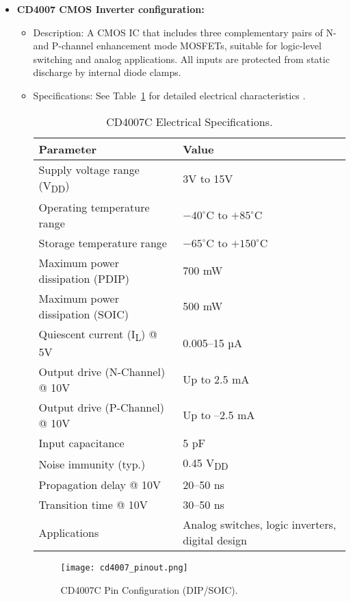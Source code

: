 \documentclass[conference]{IEEEtran}
\begin{document}
\begin{itemize}
    \item \textbf{CD4007 CMOS Inverter configuration:}
    \begin{itemize}
        \item Description: A CMOS IC that includes three complementary pairs of N- and P-channel enhancement mode MOSFETs, suitable for logic-level switching and analog applications. All inputs are protected from static discharge by internal diode clamps.
        \item Specifications: See Table~\ref{tab:cd4007_specs} for detailed electrical characteristics \cite{CD4007_Datasheet}.
        \begin{table}[h]
            \centering
            \begin{tabular}{ll}
                \toprule
                \textbf{Parameter} & \textbf{Value} \\
                \midrule
                Supply voltage range (V\textsubscript{DD}) & 3V to 15V \\
                Operating temperature range & $-40^{\circ}$C to $+85^{\circ}$C \\
                Storage temperature range & $-65^{\circ}$C to $+150^{\circ}$C \\
                Maximum power dissipation (PDIP) & 700 mW \\
                Maximum power dissipation (SOIC) & 500 mW \\
                Quiescent current (I\textsubscript{L}) @ 5V & 0.005–15 µA \\
                Output drive (N-Channel) @ 10V & Up to 2.5 mA \\
                Output drive (P-Channel) @ 10V & Up to –2.5 mA \\
                Input capacitance & 5 pF \\
                Noise immunity (typ.) & 0.45 V\textsubscript{DD} \\
                Propagation delay @ 10V & 20–50 ns \\
                Transition time @ 10V & 30–50 ns \\
                Applications & Analog switches, logic inverters, digital design \\
                \bottomrule
            \end{tabular}
            \caption{CD4007C Electrical Specifications.}
            \label{tab:cd4007_specs}
        \end{table}
        \begin{figure}[h]
            \centering
            \texttt{[image: cd4007\_pinout.png]} %
            \caption{CD4007C Pin Configuration (DIP/SOIC).}
            \label{fig:cd4007_pinout}
        \end{figure}
    \end{itemize}


\end{itemize}
\end{document}
